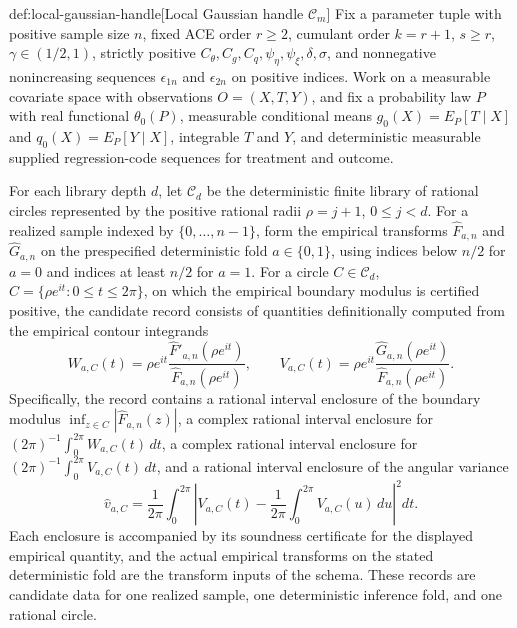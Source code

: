 \begin{definitionv}{def:local-gaussian-handle}[Local Gaussian handle \(\mathscr C_m\)]
Fix a parameter tuple with positive sample size \(n\), fixed ACE order \(r\ge2\), cumulant order \(k=r+1\), \(s\ge r\), \(\gamma\in(1/2,1)\), strictly positive \(C_\theta,C_g,C_q,\psi_\eta,\psi_\xi,\delta,\sigma\), and nonnegative nonincreasing sequences \(\epsilon_{1n}\) and \(\epsilon_{2n}\) on positive indices. Work on a measurable covariate space with observations \(O=(X,T,Y)\), and fix a probability law \(P\) with real functional \(\theta_0(P)\), measurable conditional means \(g_0(X)=E_P[T\mid X]\) and \(q_0(X)=E_P[Y\mid X]\), integrable \(T\) and \(Y\), and deterministic measurable supplied regression-code sequences for treatment and outcome.

For each library depth \(d\), let \(\mathscr C_d\) be the deterministic finite library of rational circles represented by the positive rational radii \(\rho=j+1\), \(0\le j<d\). For a realized sample indexed by \(\{0,\ldots,n-1\}\), form the empirical transforms \(\widehat F_{a,n}\) and \(\widehat G_{a,n}\) on the prespecified deterministic fold \(a\in\{0,1\}\), using indices below \(n/2\) for \(a=0\) and indices at least \(n/2\) for \(a=1\). For a circle \(C\in\mathscr C_d\), \(C=\{\rho e^{it}:0\le t\le2\pi\}\), on which the empirical boundary modulus is certified positive, the candidate record consists of quantities definitionally computed from the empirical contour integrands
\[
 W_{a,C}(t)=\rho e^{it}
 \frac{\widehat F'_{a,n}(\rho e^{it})}
      {\widehat F_{a,n}(\rho e^{it})},
 \qquad
 V_{a,C}(t)=\rho e^{it}
 \frac{\widehat G_{a,n}(\rho e^{it})}
      {\widehat F_{a,n}(\rho e^{it})}.
\]
Specifically, the record contains a rational interval enclosure of the boundary modulus \(\inf_{z\in C}|\widehat F_{a,n}(z)|\), a complex rational interval enclosure for \((2\pi)^{-1}\int_0^{2\pi}W_{a,C}(t)\,dt\), a complex rational interval enclosure for \((2\pi)^{-1}\int_0^{2\pi}V_{a,C}(t)\,dt\), and a rational interval enclosure of the angular variance
\[
 \widehat v_{a,C}
 =\frac1{2\pi}\int_0^{2\pi}
 \left|V_{a,C}(t)-
 \frac1{2\pi}\int_0^{2\pi}V_{a,C}(u)\,du\right|^2dt.
\]
Each enclosure is accompanied by its soundness certificate for the displayed empirical quantity, and the actual empirical transforms on the stated deterministic fold are the transform inputs of the schema. These records are candidate data for one realized sample, one deterministic inference fold, and one rational circle.
\end{definitionv}

